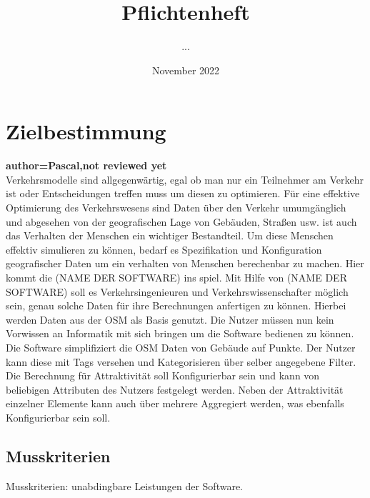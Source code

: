 \documentclass[parskip=full]{scrartcl} %
\title{Pflichtenheft}
\author{...}
\date{November 2022}
\begin{document}
\maketitle
\newpage

\tableofcontents
\newpage




\section{Zielbestimmung}

\textbf{author=Pascal,not reviewed yet\\}
Verkehrsmodelle sind allgegenwärtig, egal ob man nur ein Teilnehmer am Verkehr ist oder Entscheidungen treffen muss um diesen zu optimieren.
Für eine effektive Optimierung des Verkehrswesens sind Daten über den Verkehr umumgänglich und abgesehen von der geografischen Lage von Gebäuden, Straßen usw. ist auch das Verhalten der Menschen ein wichtiger Bestandteil.
Um diese Menschen effektiv simulieren zu können, bedarf es Spezifikation und Konfiguration geografischer Daten um ein verhalten von Menschen berechenbar zu machen.
Hier kommt die (NAME DER SOFTWARE) ins spiel.
Mit Hilfe von (NAME DER SOFTWARE) soll es  Verkehrsingenieuren und Verkehrswissenschafter möglich sein, genau solche Daten für ihre Berechnungen anfertigen zu können.
Hierbei werden Daten aus der OSM als Basis genutzt.
Die Nutzer müssen nun kein Vorwissen an Informatik mit sich bringen um die Software bedienen zu können.
Die Software simplifiziert die OSM Daten von Gebäude auf Punkte. Der Nutzer kann diese mit Tags versehen und Kategorisieren über selber angegebene Filter.
Die Berechnung für Attraktivität soll Konfigurierbar sein und kann von beliebigen Attributen des Nutzers festgelegt werden.
Neben der Attraktivität einzelner Elemente kann auch über mehrere Aggregiert werden, was ebenfalls Konfigurierbar sein soll.

\subsection{Musskriterien}
Musskriterien: unabdingbare Leistungen der Software.
\end{document}
